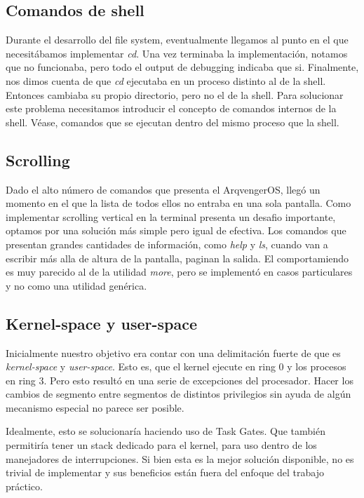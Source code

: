 \documentclass[a4paper,10pt]{article}
\begin{document}
      \subsection{Comandos de shell}
      Durante el desarrollo del file system, eventualmente llegamos al punto en el que necesitábamos implementar \textit{cd}.
      Una vez terminaba la implementación, notamos que no funcionaba, pero todo el output de debugging indicaba que si.
      Finalmente, nos dimos cuenta de que \textit{cd} ejecutaba en un proceso distinto al de la shell.
      Entonces cambiaba su propio directorio, pero no el de la shell.
      Para solucionar este problema necesitamos introducir el concepto de comandos internos de la shell.
      Véase, comandos que se ejecutan dentro del mismo proceso que la shell.

      \subsection{Scrolling}
      Dado el alto número de comandos que presenta el ArqvengerOS, llegó un momento en el que la lista de todos ellos no entraba en una sola pantalla.
      Como implementar scrolling vertical en la terminal presenta un desafio importante, optamos por una solución más simple pero igual de efectiva.
      Los comandos que presentan grandes cantidades de información, como \textit{help} y \textit{ls}, cuando van a escribir más alla de altura de la pantalla, 
      paginan la salida.
      El comportamiendo es muy parecido al de la utilidad \textit{more}, pero se implementó en casos particulares y no como una utilidad genérica.

      \subsection{Kernel-space y user-space}
      Inicialmente nuestro objetivo era contar con una delimitación fuerte de que es \textit{kernel-space} y \textit{user-space}.
      Esto es, que el kernel ejecute en ring 0 y los procesos en ring 3.
      Pero esto resultó en una serie de excepciones del procesador.
      Hacer los cambios de segmento entre segmentos de distintos privilegios sin ayuda de algún mecanismo especial no parece ser posible.

      Idealmente, esto se solucionaría haciendo uso de Task Gates.
      Que también permitiría tener un stack dedicado para el kernel, para uso dentro de los manejadores de interrupciones.
      Si bien esta es la mejor solución disponible, no es trivial de implementar y sus beneficios están fuera del enfoque del trabajo práctico.
      
\end{document}
